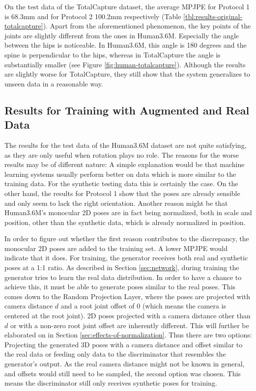 On the test data of the TotalCapture dataset, the average MPJPE for Protocol 1 is 68.3mm and for Protocol 2 100.2mm respectively (Table \ref{tbl:results-original-totalcapture}).
Apart from the aforementioned phenomenon, the key points of the joints are slightly different from the ones in Human3.6M.
Especially the angle between the hips is noticeable.
In Human3.6M, this angle is 180 degrees and the spine is perpendicular to the hips, whereas in TotalCapture the angle is substantially smaller (see Figure \ref{fig:human-totalcapture}).
Although the results are slightly worse for TotalCapture, they still show that the system generalizes to unseen data in a reasonable way.




\subsection{Results for Training with Augmented and Real Data}
The results for the test data of the Human3.6M dataset are not quite satisfying, as they are only useful when rotation plays no role.
The reasons for the worse results may be of different nature:
A simple explanation would be that machine learning systems usually perform better on data which is more similar to the training data.
For the synthetic testing data this is certainly the case.
On the other hand, the results for Protocol 1 show that the poses are already sensible and only seem to lack the right orientation.
Another reason might be that Human3.6M's monocular 2D poses are in fact being normalized, both in scale and position, other than the synthetic data, which is already normalized in position.

In order to figure out whether the first reason contributes to the discrepancy, the monocular 2D poses are added to the training set.
A lower MPJPE would indicate that it does.
For training, the generator receives both real and synthetic poses at a 1:1 ratio.
As described in Section \ref{sec:network}, during training the generator tries to learn the real data distribution.
In order to have a chance to achieve this, it must be able to generate poses similar to the real poses. 
This comes down to the Random Projection Layer, where the poses are projected with camera distance $d$ and a root joint offset of $0$ (which means the camera is centered at the root joint).
2D poses projected with a camera distance other than $d$ or with a non-zero root joint offset are inherently different.
This will further be elaborated on in Section \ref{sec:effects-of-normalization}.
Thus there are two options:
Projecting the generated 3D poses with a camera distance and offset similar to the real data or feeding only data to the discriminator that resembles the generator's output.
As the real camera distance might not be known in general, and offsets would still need to be sampled, the second option was chosen.
This means the discriminator still only receives synthetic poses for training.

